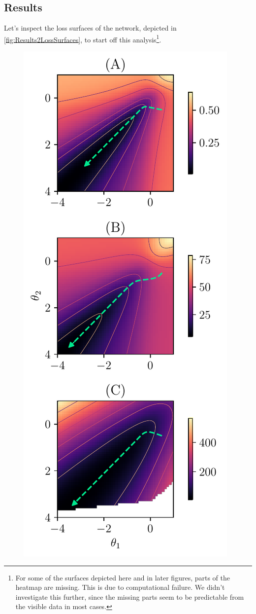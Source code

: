 \subsection{Results}\label{sec:ResultsOf2ParameterNetwork}
Let's inspect the loss surfaces of the network, depicted in \cref{fig:Results2LossSurfaces}, to start off this analysis\footnote{For some of the surfaces depicted here and in later figures, parts of the heatmap are missing. This is due to computational failure. We didn't investigate this further, since the missing parts seem to be predictable from the visible data in most cases.}.
\begin{figure}
	\centering
	\includegraphics{Experiment2/plots/LossSurfaces.pdf}

\end{figure}
